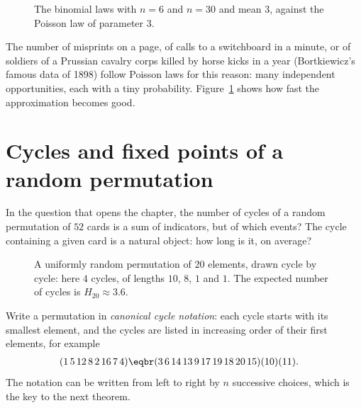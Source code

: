 \begin{figure}[ht]
\centering
{}
\caption{The binomial laws with $n=6$ and $n=30$ and mean $3$, against the Poisson law of parameter $3$.}
\label{fig:poisson}
\end{figure}

The number of misprints on a page, of calls to a switchboard in a minute, or of soldiers of a Prussian cavalry
corps killed by horse kicks in a year (Bortkiewicz's famous data of 1898) follow Poisson laws for this reason:
many independent opportunities, each with a tiny probability. Figure~\ref{fig:poisson} shows how fast the
approximation becomes good.

\section{Cycles and fixed points of a random permutation}

\begin{think}
In the question that opens the chapter, the number of cycles of a random permutation of $52$ cards is a sum of
indicators, but of which events? The cycle containing a given card is a natural object: how long is it, on
average?
\end{think}

\begin{figure}[ht]
\centering
{}
\caption{A uniformly random permutation of $20$ elements, drawn cycle by cycle: here $4$ cycles, of lengths $10$,
$8$, $1$ and $1$. The expected number of cycles is $H_{20}\approx3.6$.}
\label{fig:cycles}
\end{figure}

Write a permutation in \emph{canonical cycle notation}: each cycle starts with its smallest element, and the cycles
are listed in increasing order of their first elements, for example
\[
\begin{aligned}&(1\,5\,12\,8\,2\,16\,7\,4)\eqbr(3\,6\,14\,13\,9\,17\,19\,18\,20\,15)(10)(11).\end{aligned}
\]
The notation can be written from left to right by $n$ successive choices, which is the key to the next theorem.

